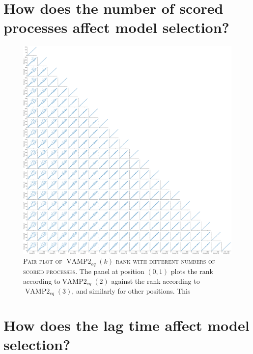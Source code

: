 \documentclass{article}
\begin{document}
\section{How does the number of scored processes affect model selection?}

\begin{figure}
    \centering
    \includegraphics[width=1.0\textwidth]{figures/vampeq_rank_vs_proc_pairplot.pdf}
    \caption{\textsc{Pair plot of $\operatorname{VAMP2}_{eq}(k)$ rank with different numbers of scored processes}. The panel at position $(0,1)$ plots the rank according to$\operatorname{VAMP2}_{eq}(2)$ against the  rank according to$\operatorname{VAMP2}_{eq}(3)$, and similarly for other positions. This }
    \label{fig:vampeq_rank_vs_proc_pairplot}
\end{figure}

\section{How does the lag time affect model selection?}
\end{document}
